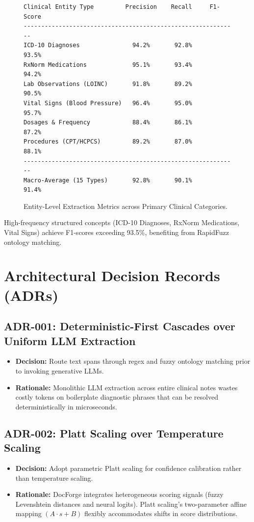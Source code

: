 \documentclass[10pt,journal,compsoc]{IEEEtran}
\begin{document}
\begin{figure}[!h]
\centering
\begin{lstlisting}
Clinical Entity Type         Precision    Recall     F1-Score
-------------------------------------------------------------
ICD-10 Diagnoses               94.2%       92.8%       93.5%
RxNorm Medications             95.1%       93.4%       94.2%
Lab Observations (LOINC)       91.8%       89.2%       90.5%
Vital Signs (Blood Pressure)   96.4%       95.0%       95.7%
Dosages & Frequency            88.4%       86.1%       87.2%
Procedures (CPT/HCPCS)         89.2%       87.0%       88.1%
-------------------------------------------------------------
Macro-Average (15 Types)       92.8%       90.1%       91.4%
\end{lstlisting}
\caption{Entity-Level Extraction Metrics across Primary Clinical Categories.}
\label{fig:entity_f1}
\end{figure}

High-frequency structured concepts (ICD-10 Diagnoses, RxNorm Medications, Vital Signs) achieve F1-scores exceeding 93.5\%, benefiting from RapidFuzz ontology matching.

\section{Architectural Decision Records (ADRs)}
\subsection{ADR-001: Deterministic-First Cascades over Uniform LLM Extraction}
\begin{itemize}
    \item \textbf{Decision:} Route text spans through regex and fuzzy ontology matching prior to invoking generative LLMs.
    \item \textbf{Rationale:} Monolithic LLM extraction across entire clinical notes wastes costly tokens on boilerplate diagnostic phrases that can be resolved deterministically in microseconds.
\end{itemize}

\subsection{ADR-002: Platt Scaling over Temperature Scaling}
\begin{itemize}
    \item \textbf{Decision:} Adopt parametric Platt scaling for confidence calibration rather than temperature scaling.
    \item \textbf{Rationale:} DocForge integrates heterogeneous scoring signals (fuzzy Levenshtein distances and neural logits). Platt scaling's two-parameter affine mapping $(A \cdot s + B)$ flexibly accommodates shifts in score distributions.
\end{itemize}
\end{document}
